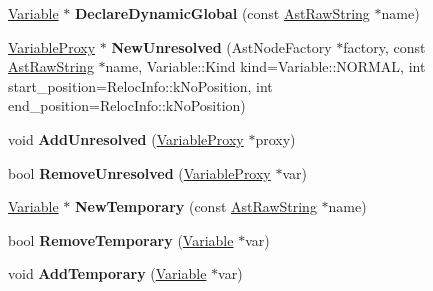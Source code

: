 \begin{DoxyCompactItemize}
\item 
\hyperlink{classv8_1_1internal_1_1_variable}{Variable} $\ast$ {\bfseries Declare\+Dynamic\+Global} (const \hyperlink{classv8_1_1internal_1_1_ast_raw_string}{Ast\+Raw\+String} $\ast$name)\hypertarget{classv8_1_1internal_1_1_scope_a4aee616d790a86a88ca1c2c9a350e71f}{}\label{classv8_1_1internal_1_1_scope_a4aee616d790a86a88ca1c2c9a350e71f}

\item 
\hyperlink{classv8_1_1internal_1_1_variable_proxy}{Variable\+Proxy} $\ast$ {\bfseries New\+Unresolved} (Ast\+Node\+Factory $\ast$factory, const \hyperlink{classv8_1_1internal_1_1_ast_raw_string}{Ast\+Raw\+String} $\ast$name, Variable\+::\+Kind kind=Variable\+::\+N\+O\+R\+M\+AL, int start\+\_\+position=Reloc\+Info\+::k\+No\+Position, int end\+\_\+position=Reloc\+Info\+::k\+No\+Position)\hypertarget{classv8_1_1internal_1_1_scope_a595ae0e9984e0c69e104c919f5db3bd5}{}\label{classv8_1_1internal_1_1_scope_a595ae0e9984e0c69e104c919f5db3bd5}

\item 
void {\bfseries Add\+Unresolved} (\hyperlink{classv8_1_1internal_1_1_variable_proxy}{Variable\+Proxy} $\ast$proxy)\hypertarget{classv8_1_1internal_1_1_scope_ad75331bcddcce8ba25956eff5085545f}{}\label{classv8_1_1internal_1_1_scope_ad75331bcddcce8ba25956eff5085545f}

\item 
bool {\bfseries Remove\+Unresolved} (\hyperlink{classv8_1_1internal_1_1_variable_proxy}{Variable\+Proxy} $\ast$var)\hypertarget{classv8_1_1internal_1_1_scope_a9c774461387c0fd7b64976bee066b6f8}{}\label{classv8_1_1internal_1_1_scope_a9c774461387c0fd7b64976bee066b6f8}

\item 
\hyperlink{classv8_1_1internal_1_1_variable}{Variable} $\ast$ {\bfseries New\+Temporary} (const \hyperlink{classv8_1_1internal_1_1_ast_raw_string}{Ast\+Raw\+String} $\ast$name)\hypertarget{classv8_1_1internal_1_1_scope_aac81b30a6d8592a48c2d05626bbab1ba}{}\label{classv8_1_1internal_1_1_scope_aac81b30a6d8592a48c2d05626bbab1ba}

\item 
bool {\bfseries Remove\+Temporary} (\hyperlink{classv8_1_1internal_1_1_variable}{Variable} $\ast$var)\hypertarget{classv8_1_1internal_1_1_scope_a0705d2c07e82afbec941665b2d2d90f5}{}\label{classv8_1_1internal_1_1_scope_a0705d2c07e82afbec941665b2d2d90f5}

\item 
void {\bfseries Add\+Temporary} (\hyperlink{classv8_1_1internal_1_1_variable}{Variable} $\ast$var)\hypertarget{classv8_1_1internal_1_1_scope_ad90d93e906af2d1b676adeae611ed48b}{}\label{classv8_1_1internal_1_1_scope_ad90d93e906af2d1b676adeae611ed48b}


\end{DoxyCompactItemize}
